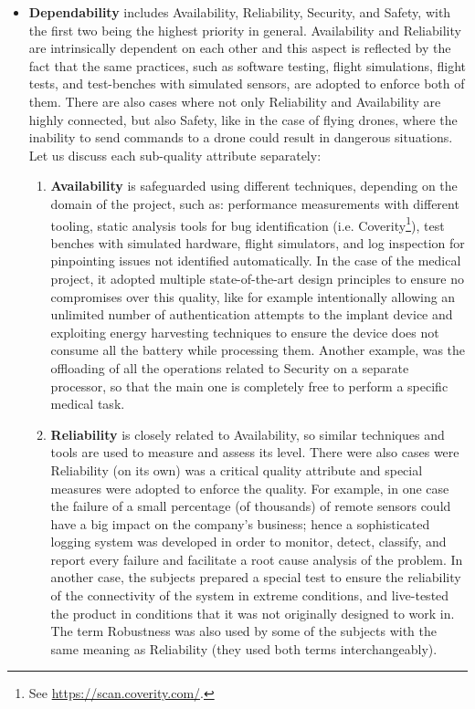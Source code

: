\begin{itemize}
    \item \textbf{Dependability} includes Availability, Reliability, Security, and Safety, with the first two being the highest priority in general. Availability and Reliability are intrinsically dependent on each other and this aspect is reflected by the fact that the same practices, such as software testing, flight simulations, flight tests, and test-benches with simulated sensors, are adopted to enforce both of them.
    There are also cases where not only Reliability and Availability are highly connected, but also Safety, like in the case of flying drones, where the inability to send commands to a drone could result in dangerous situations.
    Let us discuss each sub-quality attribute separately:
    \begin{enumerate}[label=\alph*)]
        \item \textbf{Availability} is safeguarded using different techniques, depending on the domain of the project, such as: performance measurements with different tooling, static analysis tools for bug identification (i.e. Coverity\footnote{See \url{https://scan.coverity.com/}.}), test benches with simulated hardware, flight simulators, and log inspection for pinpointing issues not identified automatically. In the case of the medical project, it adopted multiple state-of-the-art design principles to ensure no compromises over this quality, like for example intentionally allowing an unlimited number of authentication attempts to the implant device and exploiting energy harvesting techniques to ensure the device does not consume all the battery while processing them. Another example, was the offloading of all the operations related to Security on a separate processor, so that the main one is completely free to perform a specific medical task.
        
        \item \textbf{Reliability} is closely related to Availability, so similar techniques and tools are used to measure and assess its level.
        There were also cases were Reliability (on its own) was a critical quality attribute and special measures were adopted to enforce the quality. For example, in one case the failure of a small percentage (of thousands) of remote sensors could have a big impact on the company's business; hence a sophisticated logging system was developed in order to monitor, detect, classify, and report every failure and facilitate a root cause analysis of the problem.
        In another case, the subjects prepared a special test to ensure the reliability of the connectivity of the system in extreme conditions, and live-tested the product in conditions that it was not originally designed to work in. 
        The term Robustness was also used by some of the subjects with the same meaning as Reliability (they used both terms interchangeably).


\end{enumerate}
\end{itemize}
